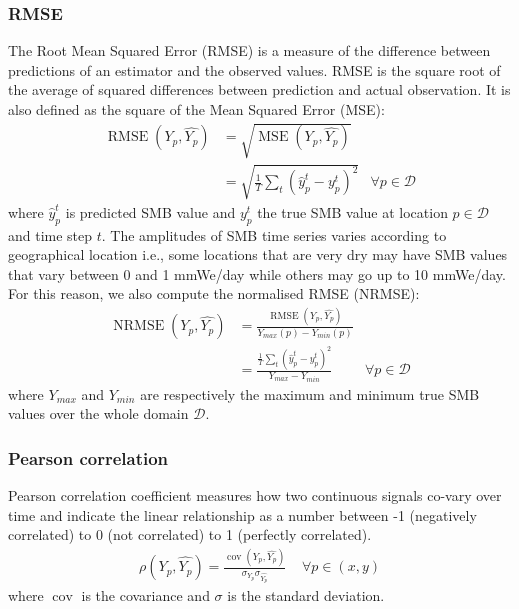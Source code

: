 \documentclass[a4paper,11pt,oneside]{report}
\begin{document}
\subsubsection{RMSE}\label{subsubsec:rmse}
The Root Mean Squared Error (RMSE) is a measure of the difference between predictions of an estimator and the observed values. RMSE is the square root of the average of squared differences between prediction and actual observation. It is also defined as the square of the Mean Squared Error (MSE):
\begin{align}
        \operatorname{RMSE}\left(Y_{p},\widehat{Y_{p}}\right) & = \sqrt{\operatorname{MSE}\left(Y_{p},\widehat{Y_{p}}\right)} \\ & = \sqrt{\frac{1}{T}\sum_{t}(\hat{y}_{p}^{t}-y^{t}_{p})^2} & \forall p \in \mathcal{D} 
\end{align}
where $\hat{y}_{p}^{t}$ is predicted SMB value and $y^{t}_{p}$ the true SMB value at location $p\in \mathcal{D} $ and time step $t$. The amplitudes of SMB time series varies according to geographical location i.e., some locations that are very dry may have SMB values that vary between 0 and 1 mmWe/day while others may go up to 10 mmWe/day. For this reason, we also compute the normalised RMSE (NRMSE):
\begin{align}
        \operatorname{NRMSE}\left(Y_{p},\widehat{Y_{p}}\right) & = \frac{\operatorname{RMSE}\left(Y_{p},\widehat{Y_{p}}\right)}{Y_{max}(p) - Y_{min}(p)} \\ & = \frac{\frac{1}{T}\sum_{t}(\hat{y}_{p}^{t}-y^{t}_{p})^2}{Y_{max} - Y_{min}} & \forall p \in \mathcal{D} 
\end{align}
where $Y_{max}$ and $Y_{min}$ are respectively the maximum and minimum true SMB values over the whole domain $\mathcal{D}$. 


\subsubsection{Pearson correlation}\label{subsubsec:pearson}
Pearson correlation coefficient measures how two continuous signals co-vary over time and indicate the linear relationship as a number between -1 (negatively correlated) to 0 (not correlated) to 1 (perfectly correlated).
\begin{align}
    \rho\left(Y_{p},\widehat{Y_{p}}\right) = \frac{\operatorname{cov}(Y_{p},\widehat{Y_{p}})}{\sigma_{Y_{p}}\sigma_{\widehat{Y_{p}}}} \;\;\;\; \forall p \in (x,y)
\end{align}
where $\operatorname {cov}$  is the covariance and  $\sigma$ is the standard deviation.
\end{document}
